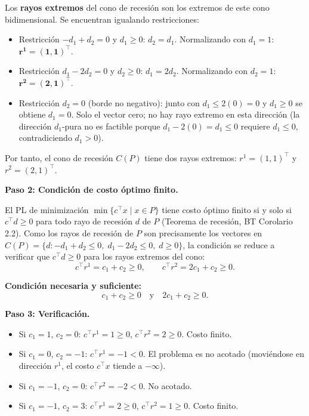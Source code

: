 \documentclass{article}
\begin{document}
Los \textbf{rayos extremos} del cono de recesión son los extremos de este cono bidimensional. Se encuentran igualando restricciones:
\begin{itemize}
\item Restricción $-d_1 + d_2 = 0$ y $d_1 \geq 0$: $d_2 = d_1$. Normalizando con $d_1 = 1$: $\mathbf{r^1 = (1, 1)^\top}$.
\item Restricción $d_1 - 2d_2 = 0$ y $d_2 \geq 0$: $d_1 = 2d_2$. Normalizando con $d_2 = 1$: $\mathbf{r^2 = (2, 1)^\top}$.
\item Restricción $d_2 = 0$ (borde no negativo): junto con $d_1 \leq 2(0) = 0$ y $d_1 \geq 0$ se obtiene $d_1 = 0$. Solo el vector cero; no hay rayo extremo en esta dirección (la dirección $d_1$-pura no es factible porque $d_1 - 2(0) = d_1 \leq 0$ requiere $d_1 \leq 0$, contradiciendo $d_1 > 0$).
\end{itemize}

Por tanto, el cono de recesión $C(P)$ tiene dos rayos extremos: $r^1 = (1,1)^\top$ y $r^2 = (2,1)^\top$.

\textbf{Paso 2: Condición de costo óptimo finito.}

El PL de minimización $\min\{c^\top x \mid x \in P\}$ tiene costo óptimo finito si y solo si $c^\top d \geq 0$ para todo rayo de recesión $d$ de $P$ (Teorema de recesión, BT Corolario 2.2). Como los rayos de recesión de $P$ son precisamente los vectores en $C(P) = \{d : -d_1 + d_2 \leq 0,\; d_1 - 2d_2 \leq 0,\; d \geq 0\}$, la condición se reduce a verificar que $c^\top d \geq 0$ para los rayos extremos del cono:
\[
c^\top r^1 = c_1 + c_2 \geq 0, \qquad c^\top r^2 = 2c_1 + c_2 \geq 0.
\]

\textbf{Condición necesaria y suficiente:}
\[
\boxed{c_1 + c_2 \geq 0 \quad \text{y} \quad 2c_1 + c_2 \geq 0.}
\]

\textbf{Paso 3: Verificación.}

\begin{itemize}
\item Si $c_1 = 1$, $c_2 = 0$: $c^\top r^1 = 1 \geq 0$, $c^\top r^2 = 2 \geq 0$. Costo finito. \checkmark
\item Si $c_1 = 0$, $c_2 = -1$: $c^\top r^1 = -1 < 0$. El problema es no acotado (moviéndose en dirección $r^1$, el costo $c^\top x$ tiende a $-\infty$). \checkmark
\item Si $c_1 = -1$, $c_2 = 0$: $c^\top r^2 = -2 < 0$. No acotado. \checkmark
\item Si $c_1 = -1$, $c_2 = 3$: $c^\top r^1 = 2 \geq 0$, $c^\top r^2 = 1 \geq 0$. Costo finito. \checkmark
\end{itemize}
\end{document}
